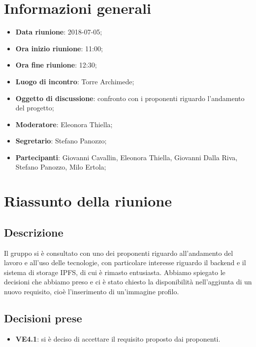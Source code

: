 \section{Informazioni generali}
	\begin{itemize}
		\item \textbf{Data riunione}: 2018-07-05;
		\item \textbf{Ora inizio riunione}: 11:00;
		\item \textbf{Ora fine riunione}: 12:30;
		\item \textbf{Luogo di incontro}: Torre Archimede;
		\item \textbf{Oggetto di discussione}: confronto con i proponenti riguardo l'andamento del progetto;
		\item \textbf{Moderatore}: Eleonora Thiella;
		\item \textbf{Segretario}: Stefano Panozzo;
		\item \textbf{Partecipanti}: Giovanni Cavallin, Eleonora Thiella, Giovanni Dalla Riva, Stefano Panozzo, Milo Ertola;
	\end{itemize}

\section{Riassunto della riunione}
	\subsection{Descrizione} 
	Il gruppo si è consultato con uno dei proponenti riguardo all'andamento del lavoro e all'uso delle tecnologie, con particolare interesse riguardo il backend e il sistema di storage IPFS, di cui è rimasto entusiasta.
	Abbiamo spiegato le decisioni che abbiamo preso e ci è stato chiesto la disponibilità nell'aggiunta di un nuovo requisito, cioè l'inserimento di un'immagine profilo.
	
	\subsection{Decisioni prese}
		\begin{itemize}
			\item \textbf{VE4.1}: si è deciso di accettare il requisito proposto dai proponenti.
		\end{itemize}